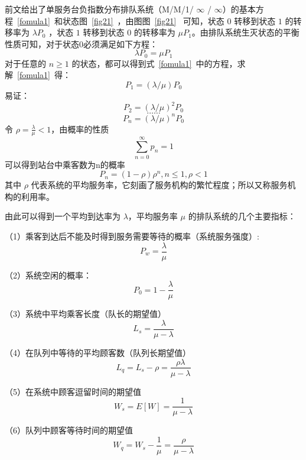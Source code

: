 前文给出了单服务台负指数分布排队系统（M/M/1/ $\infty $ / $\infty $）的基本方程~\ref{fomula1}~和状态图~\ref{fig21}~，由图图~\ref{fig21}~
可知，状态 $0$ 转移到状态 $1$ 的转移率为 $\lambda P_0$ ，状态 $1$ 转移到状态 $0$ 的转移率为 $\mu P_1$。由排队系统生灭状态的平衡性质可知，对于状态0必须满足如下方程：
$$\lambda P_0 = \mu P_1$$
对于任意的 $n \ge 1$ 的状态，都可以得到式~\ref{fomula1}~中的方程，求解~\ref{fomula1}~得：
$$P_1 = (\lambda / \mu)P_0$$
易证：
$$P_2 = \left(\lambda / \mu \right)^2 P_0$$
$$……$$
$$P_n = \left(\lambda / \mu \right)^n P_0$$
令 $\rho = \frac{\lambda}{\mu} < 1$，由概率的性质
$$\sum_{n=0}^{\infty}p_n = 1$$ 可以得到站台中乘客数为n的概率 $$P_n = (1-\rho)\rho^n, n \le 1, \rho < 1$$
其中 $\rho$ 代表系统的平均服务率，它刻画了服务机构的繁忙程度；所以又称服务机构的利用率。

由此可以得到一个平均到达率为 $\lambda$，平均服务率 $\mu$ 的排队系统的几个主要指标：

（1）乘客到达后不能及时得到服务需要等待的概率（系统服务强度）:
\begin{equation}\label{fomula31}
    P_w = \frac{\lambda}{\mu}
\end{equation}

（2）系统空闲的概率：
\begin{equation}
    P_0 = 1-\frac{\lambda}{\mu}
\end{equation}

（3）系统中平均乘客长度（队长的期望值）
\begin{equation}
    L_s = \frac{\lambda}{\mu - \lambda}
\end{equation}

（4）在队列中等待的平均顾客数（队列长期望值）
\begin{equation}
    L_q = L_s - \rho = \frac{\rho \lambda}{\mu - \lambda}
\end{equation}

（5）在系统中顾客逗留时间的期望值
\begin{equation}
    W_s = E[W] = \frac{1}{\mu - \lambda}
\end{equation}

（6）队列中顾客等待时间的期望值
\begin{equation}\label{fomula36}
    W_q = W_s - \frac{1}{\mu} = \frac{\rho}{\mu - \lambda}
\end{equation}


